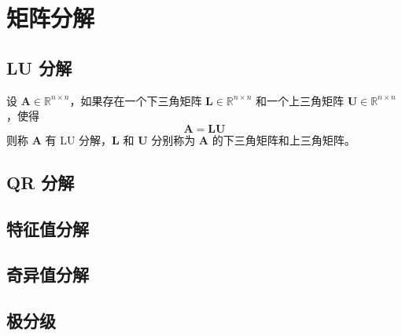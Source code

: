 \section{矩阵分解}




\subsection{LU 分解}

\begin{definition}[LU 分解]
设 $\mathbf{A} \in \mathbb{R}^{n \times n}$，如果存在一个下三角矩阵 $\mathbf{L} \in \mathbb{R}^{n \times n}$ 和一个上三角矩阵 $\mathbf{U} \in \mathbb{R}^{n \times n}$，使得
\[
\mathbf{A} = \mathbf{L} \mathbf{U}
\]
则称 $\mathbf{A}$ 有 LU 分解，$\mathbf{L}$ 和 $\mathbf{U}$ 分别称为 $\mathbf{A}$ 的下三角矩阵和上三角矩阵。
\end{definition}

\begin{proposition}
    
\end{proposition}

\subsection{QR 分解}


\subsection{特征值分解}


\subsection{奇异值分解}

\subsection{极分级}

\newpage